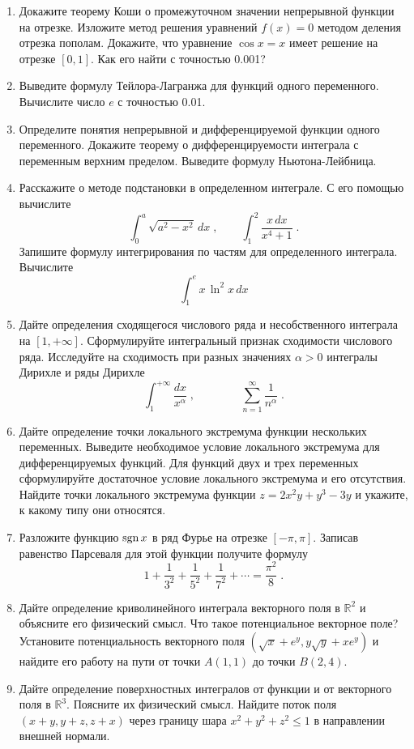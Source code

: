 %
%

\begin{enumerate}
\item Докажите теорему Коши о промежуточном значении непрерывной функции на отрезке. Изложите метод решения уравнений $f(x) = 0$ методом деления отрезка пополам. Докажите, что уравнение $\cos{x} = x$ имеет решение на отрезке $[0, 1]$. Как его найти с точностью 0.001?

\item Выведите формулу Тейлора-Лагранжа для функций одного переменного. Вычислите число $e$ с точностью 0.01. 

\item Определите понятия непрерывной и дифференцируемой функции одного переменного. Докажите теорему о дифференцируемости интеграла с переменным верхним пределом. Выведите формулу Ньютона-Лейбница.

\item Расскажите о методе подстановки в определенном интеграле. С его помощью вычислите 
$$
\int_0^a\!\sqrt{a^2 - x^2}\, dx\;, \qquad \int_1^2\! \frac{x\,dx}{x^4 + 1}\;.
$$
Запишите формулу интегрирования по частям для определенного интеграла. Вычислите 
$$
\int_1^e\! x\, \ln^2{x} \, dx
$$

\item Дайте определения сходящегося числового ряда и несобственного интеграла на $[1, +\infty]$. Сформулируйте интегральный признак сходимости числового ряда. Исследуйте на сходимость при разных значениях $\alpha > 0$ интегралы Дирихле и ряды Дирихле
$$
\int_1^{+\infty}\! \frac{dx}{x^\alpha} \;,\qquad\qquad
%
\sum_{n=1}^{\infty} \frac{1}{n^\alpha} \;.
$$

\item Дайте определение точки локального экстремума функции нескольких переменных. Выведите необходимое условие локального экстремума для дифференцируемых функций. Для функций двух и трех переменных сформулируйте достаточное условие локального экстремума и его отсутствия. Найдите точки локального экстремума функции $z = 2x^2 y + y^3 - 3y$ и укажите, к какому типу они относятся.

\item Разложите функцию $\operatorname{sgn}{x}$ в ряд Фурье на отрезке $[-\pi, \pi]$. Записав равенство Парсеваля для этой функции получите формулу
$$
1 + \frac{1}{3^2} + \frac{1}{5^2} + \frac{1}{7^2} + \cdots = \frac{\pi^2}{8} \;.
$$

\item Дайте определение криволинейного интеграла векторного поля в $\mathbb{R}^2$ и объясните его физический смысл. Что такое потенциальное векторное поле? Установите потенциальность векторного поля $(\sqrt{x} + e^y, y\sqrt{y} + x e^y)$ и найдите его работу на пути от точки $A(1, 1)$ до точки $B(2, 4)$.


\item Дайте определение поверхностных интегралов от функции и от векторного поля в $\mathbb{R}^3$. Поясните их физический смысл. Найдите поток поля $(x + y, y+z, z+x)$ через границу шара $x^2 + y^2 + z^2 \leqslant 1$ в направлении внешней нормали.


\end{enumerate}



